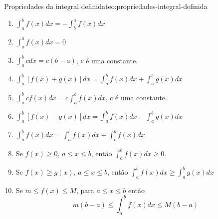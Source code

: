 \begin{teorema}{Propriedades da integral definida}{teo:propriedades-integral-definida}
  \begin{enumerate}
    \item \(\int_{a}^b f(x)dx= -\int_{b}^a f(x)dx\)
    \item \(\int_{a}^a f(x)dx=0\)
    \item \(\int_{a}^b cdx = c(b-a)\), $c$ é uma constante.
    \item \(\int_{a}^b [f(x)+g(x)]dx = \int_{a}^b f(x)dx + \int_{a}^b g(x)dx\)
    \item \(\int_{a}^b cf(x)dx= c \int_{a}^b f(x)dx\), $c$ é uma constante.
    \item \(\int_{a}^b [f(x)-g(x)]dx= \int_{a}^b f(x)dx- \int_{a}^b g(x)dx\)
    \item \(\int_{a}^b f(x)dx=\int_{a}^c f(x)dx+ \int_{c}^b f(x)dx\)
    \item Se $f(x)\geq 0$, $a \leq x \leq b$, então \(\int_{a}^b f(x)dx \geq 0\).
    \item Se $f(x) \geq g(x)$, $a \leq x \leq b$, então \(\int_{a}^b f(x)dx \geq \int_{a}^b g(x)dx\)
    \item Se $m \leq f(x) \leq M$, para $a \leq x \leq b$ então
    \[
    m(b-a) \leq \int_{a}^b f(x)dx \leq M(b-a)
    \]
  \end{enumerate}
\end{teorema}

